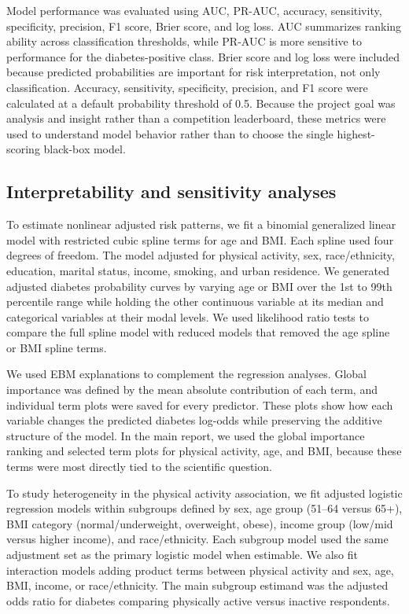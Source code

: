\documentclass[10pt]{article}
\begin{document}
Model performance was evaluated using AUC, PR-AUC, accuracy, sensitivity, specificity, precision, F1 score, Brier score, and log loss. AUC summarizes ranking ability across classification thresholds, while PR-AUC is more sensitive to performance for the diabetes-positive class. Brier score and log loss were included because predicted probabilities are important for risk interpretation, not only classification. Accuracy, sensitivity, specificity, precision, and F1 score were calculated at a default probability threshold of 0.5. Because the project goal was analysis and insight rather than a competition leaderboard, these metrics were used to understand model behavior rather than to choose the single highest-scoring black-box model.

\subsection*{Interpretability and sensitivity analyses}

To estimate nonlinear adjusted risk patterns, we fit a binomial generalized linear model with restricted cubic spline terms for age and BMI. Each spline used four degrees of freedom. The model adjusted for physical activity, sex, race/ethnicity, education, marital status, income, smoking, and urban residence. We generated adjusted diabetes probability curves by varying age or BMI over the 1st to 99th percentile range while holding the other continuous variable at its median and categorical variables at their modal levels. We used likelihood ratio tests to compare the full spline model with reduced models that removed the age spline or BMI spline terms.

We used EBM explanations to complement the regression analyses. Global importance was defined by the mean absolute contribution of each term, and individual term plots were saved for every predictor. These plots show how each variable changes the predicted diabetes log-odds while preserving the additive structure of the model. In the main report, we used the global importance ranking and selected term plots for physical activity, age, and BMI, because these terms were most directly tied to the scientific question.

To study heterogeneity in the physical activity association, we fit adjusted logistic regression models within subgroups defined by sex, age group (51--64 versus 65+), BMI category (normal/underweight, overweight, obese), income group (low/mid versus higher income), and race/ethnicity. Each subgroup model used the same adjustment set as the primary logistic model when estimable. We also fit interaction models adding product terms between physical activity and sex, age, BMI, income, or race/ethnicity. The main subgroup estimand was the adjusted odds ratio for diabetes comparing physically active versus inactive respondents.
\end{document}
